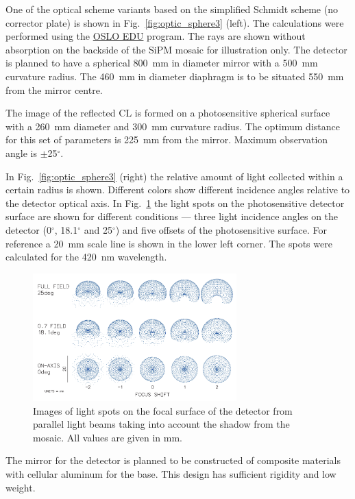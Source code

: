 \documentclass[a4paper,11pt]{article}
\begin{document}
One of the optical scheme variants based on the simplified Schmidt scheme (no corrector plate) is shown in Fig.~\ref{fig:optic_sphere3} (left). The calculations were performed using the \href{https://www.lambdares.com/oslo/}{OSLO EDU} program. The rays are shown without absorption on the backside of the SiPM mosaic for illustration only. The detector is planned to have a spherical 800~mm in diameter mirror with a 500~mm curvature radius. The 460~mm in diameter diaphragm is to be situated 550~mm from the mirror centre.

The image of the reflected CL is formed on a photosensitive spherical surface with a 260~mm diameter and 300~mm curvature radius. The optimum distance for this set of parameters is 225~mm from the mirror. Maximum observation angle is $\pm$25$^\circ$.

In Fig.~\ref{fig:optic_sphere3} (right) the relative amount of light collected within a certain radius is shown. Different colors show different incidence angles relative to the detector optical axis.
In Fig.~\ref{fig:spots} the light spots on the photosensitive detector surface are shown for different conditions --- three light incidence angles on the detector (0$^\circ$, 18.1$^\circ$ and 25$^\circ$) and five offsets of the photosensitive surface. For reference a 20~mm scale line is shown in the lower left corner. The spots were calculated for the 420~nm wavelength.

\begin{figure}[bt]
\centering
\includegraphics[width=0.7\textwidth]{Sphere3spot.pdf}
\caption{Images of light spots on the focal surface of the detector from parallel light beams taking into account the shadow from the mosaic. All values are given in mm.}
\label{fig:spots}
\end{figure}    

The mirror for the detector is planned to be constructed of composite materials with cellular aluminum for the base. This design has sufficient rigidity and low weight.
\end{document}
